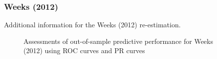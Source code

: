 

% 


\subsubsection*{Weeks (2012)}

Additional information for the Weeks (2012) re-estimation. 


\FloatBarrier

\begin{figure}
\centering   
  \caption{Assessments of out-of-sample predictive performance for Weeks (2012) using ROC curves and PR curves}
\end{figure}
\FloatBarrier
\clearpage

